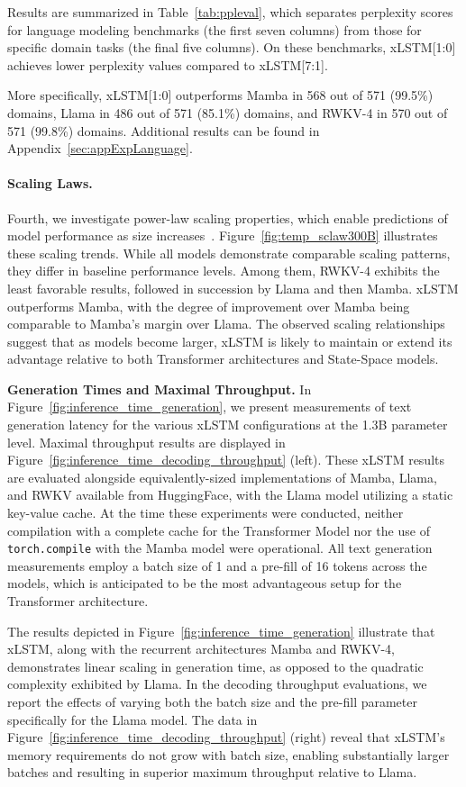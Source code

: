 Results are summarized in Table~\ref{tab:ppleval}, which separates perplexity scores for language modeling benchmarks (the first seven columns) from those for specific domain tasks (the final five columns). On these benchmarks, xLSTM[1:0] achieves lower perplexity values compared to xLSTM[7:1].

More specifically, xLSTM[1:0] outperforms Mamba in 568 out of 571 (99.5\%) domains, Llama in 486 out of 571 (85.1\%) domains, and RWKV-4 in 570 out of 571 (99.8\%) domains. Additional results can be found in Appendix~\ref{sec:appExpLanguage}.

\paragraph{Scaling Laws.} Fourth, we investigate power-law scaling properties, which enable predictions of model performance as size increases~\citep{Kaplan:20,Brown:20short}. Figure~\ref{fig:temp_sclaw300B} illustrates these scaling trends. While all models demonstrate comparable scaling patterns, they differ in baseline performance levels. Among them, RWKV-4 exhibits the least favorable results, followed in succession by Llama and then Mamba. xLSTM outperforms Mamba, with the degree of improvement over Mamba being comparable to Mamba's margin over Llama. The observed scaling relationships suggest that as models become larger, xLSTM is likely to maintain or extend its advantage relative to both Transformer architectures and State-Space models.

\textbf{Generation Times and Maximal Throughput.} In Figure~\ref{fig:inference_time_generation}, we present measurements of text generation latency for the various xLSTM configurations at the 1.3B parameter level. Maximal throughput results are displayed in Figure~\ref{fig:inference_time_decoding_throughput} (left). These xLSTM results are evaluated alongside equivalently-sized implementations of Mamba, Llama, and RWKV available from HuggingFace, with the Llama model utilizing a static key-value cache. At the time these experiments were conducted, neither compilation with a complete cache for the Transformer Model nor the use of \texttt{torch.compile} with the Mamba model were operational. All text generation measurements employ a batch size of 1 and a pre-fill of 16 tokens across the models, which is anticipated to be the most advantageous setup for the Transformer architecture.

The results depicted in Figure~\ref{fig:inference_time_generation} illustrate that xLSTM, along with the recurrent architectures Mamba and RWKV-4, demonstrates linear scaling in generation time, as opposed to the quadratic complexity exhibited by Llama. In the decoding throughput evaluations, we report the effects of varying both the batch size and the pre-fill parameter specifically for the Llama model. The data in Figure~\ref{fig:inference_time_decoding_throughput} (right) reveal that xLSTM’s memory requirements do not grow with batch size, enabling substantially larger batches and resulting in superior maximum throughput relative to Llama.

